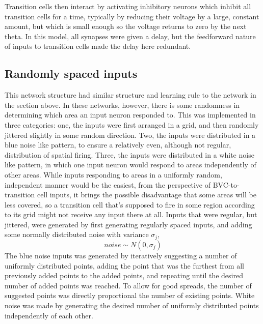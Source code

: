 \documentclass{article}
\begin{document}
    Transition cells then interact by activating inhibitory neurons which inhibit all transition cells for a time, typically by reducing their voltage by a large, constant amount, but which is small enough so the voltage returns to zero by the next theta.
    In this model, all synapses were given a delay, but the feedforward nature of inputs to transition cells made the delay here redundant.

    \subsection{Randomly spaced inputs}
    This network structure had similar structure and learning rule to the network in the section above. In these networks, however, there is some randomness in determining which area an input neuron responded to. This was implemented in three categories: one, the inputs were first arranged in a grid, and then randomly jittered slightly in some random direction. Two, the inputs were distributed in a blue noise like pattern, to ensure a relatively even, although not regular, distribution of spatial firing. Three, the inputs were distributed in a white noise like pattern, in which one input neuron would respond to areas independently of other areas.
    While inputs responding to areas in a uniformly random, independent manner would be the easiest, from the perspective of BVC-to-transition cell inputs, it brings the possible disadvantage that some areas will be less covered, so a transition cell that's supposed to fire in some region according to its grid might not receive any input there at all.
    Inputs that were regular, but jittered, were generated by first generating regularly spaced inputs, and adding some normally distributed noise with variance \(\sigma_j\), \[noise \sim N(0, \sigma_j)\]
    The blue noise inputs was generated by iteratively suggesting a number of uniformly distributed points, adding the point that was the furthest from all previously added points to the added points, and repeating until the desired number of added points was reached. To allow for good spreads, the number of suggested points was directly proportional the number of existing points.
    White noise was made by generating the desired number of uniformly distributed points independently of each other.
\end{document}
